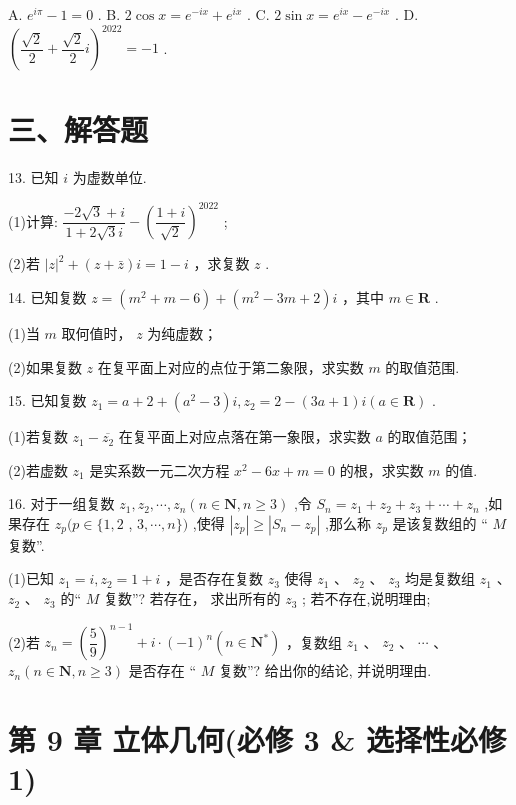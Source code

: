 A. ${{e}}^{{i}\pi } - 1 = 0$ . B. $2\cos x = {{e}}^{-{i}x} + {{e}}^{{i}x}$ . C. $2\sin x = {{e}}^{{i}x} - {{e}}^{-{i}x}$ . D. ${\left( \dfrac{\sqrt{2}}{2} + \dfrac{\sqrt{2}}{2}{i}\right) }^{2022} =  - 1$ .

\section*{三、解答题}

13. 已知 ${i}$ 为虚数单位.

(1)计算: $\dfrac{-2\sqrt{3} + {i}}{1 + 2\sqrt{3}{i}} - {\left( \dfrac{1 + {i}}{\sqrt{2}}\right) }^{2022}$ ;

(2)若 ${\left| z\right| }^{2} + \left( {z + \bar{z}}\right) {i} = 1 - {i}$ ，求复数 $z$ .

14. 已知复数 $z = \left( {{m}^{2} + m - 6}\right)  + \left( {{m}^{2} - {3m} + 2}\right) {i}$ ，其中 $m \in  \mathbf{R}$ .

(1)当 $m$ 取何值时， $z$ 为纯虚数；

(2)如果复数 $z$ 在复平面上对应的点位于第二象限，求实数 $m$ 的取值范围.

15. 已知复数 ${z}_{1} = a + 2 + \left( {{a}^{2} - 3}\right) {i},{z}_{2} = 2 - \left( {{3a} + 1}\right) {i}\left( {a \in  \mathbf{R}}\right)$ .

(1)若复数 ${z}_{1} - \overline{{z}_{2}}$ 在复平面上对应点落在第一象限，求实数 $a$ 的取值范围；

(2)若虚数 ${z}_{1}$ 是实系数一元二次方程 ${x}^{2} - {6x} + m = 0$ 的根，求实数 $m$ 的值.

16. 对于一组复数 ${z}_{1},{z}_{2},\cdots ,{z}_{n}\left( {n \in  \mathbf{N},n \geq  3}\right)$ ,令 ${S}_{n} = {z}_{1} + {z}_{2} + {z}_{3} + \cdots  + {z}_{n}$ ,如果存在 ${z}_{p}(p \in  \{ 1,2$ , $3,\cdots ,n\} )$ ,使得 $\left| {z}_{p}\right|  \geq  \left| {{S}_{n} - {z}_{p}}\right|$ ,那么称 ${z}_{p}$ 是该复数组的 “ $M$ 复数”.

(1)已知 ${z}_{1} = {i},{z}_{2} = 1 + {i}$ ，是否存在复数 ${z}_{3}$ 使得 ${z}_{1}$ 、 ${z}_{2}$ 、 ${z}_{3}$ 均是复数组 ${z}_{1}$ 、 ${z}_{2}$ 、 ${z}_{3}$ 的“ $M$ 复数”? 若存在， 求出所有的 ${z}_{3}$ ; 若不存在,说明理由;

(2)若 ${z}_{n} = {\left( \dfrac{5}{9}\right) }^{n - 1} + {i} \cdot  {\left( -1\right) }^{n}\left( {n \in  {\mathbf{N}}^{ * }}\right)$ ，复数组 ${z}_{1}$ 、 ${z}_{2}$ 、 $\cdots$ 、 ${z}_{n}\left( {n \in  \mathbf{N},n \geq  3}\right)$ 是否存在 “ $M$ 复数”? 给出你的结论, 并说明理由.

\section*{第 9 章 立体几何(必修 3 \& 选择性必修 1)}

